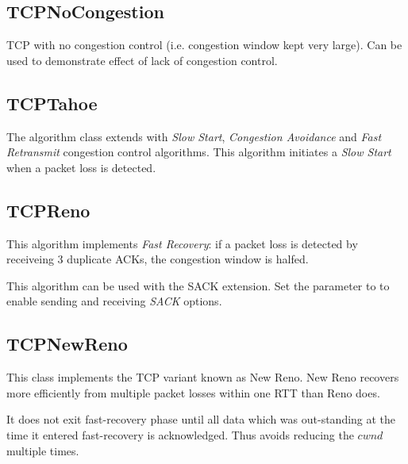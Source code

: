 
\subsection{TCPNoCongestion}

TCP with no congestion control (i.e. congestion window kept very large).
Can be used to demonstrate effect of lack of congestion control.


\subsection{TCPTahoe}

The  algorithm class extends 
with \emph{Slow Start}, \emph{Congestion Avoidance} and
\emph{Fast Retransmit} congestion control algorithms.
This algorithm initiates a \emph{Slow Start} when a packet
loss is detected.

\subsection{TCPReno}

This algorithm implements \emph{Fast Recovery}: if a packet
loss is detected by receiveing 3 duplicate ACKs, the congestion window is halfed.

This algorithm can be used with the SACK extension.
Set the  parameter to  to
enable sending and receiving \emph{SACK} options.

\subsection{TCPNewReno}

This class implements the TCP variant known as New Reno.
New Reno recovers more efficiently from multiple packet losses within one RTT
than Reno does.

It does not exit fast-recovery phase until all data which was out-standing
at the time it entered fast-recovery is acknowledged. Thus avoids
reducing the $cwnd$ multiple times.

